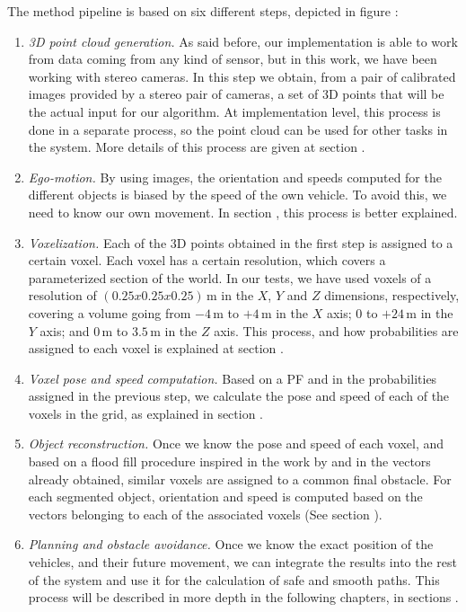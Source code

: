 The method pipeline is based on six different steps, depicted in figure \todo{ \ref{fig:cp05_pipeline_general} }:
\begin{enumerate}
 \item \emph{3D point cloud generation.} As said before, our implementation is able to work from data coming from any kind of sensor, but in this work, we have been working with stereo cameras. In this step we obtain, from a pair of calibrated images provided by a stereo pair of cameras, a set of 3D points that will be the actual input for our algorithm. At implementation level, this process is done in a separate process, so the point cloud can be used for other tasks in the system. More details of this process are given at section \todo{ \ref{chapter05_01_01} }.
 \item \emph{Ego-motion.} By using images, the orientation and speeds computed for the different objects is biased by the speed of the own vehicle. To avoid this, we need to know our own movement. In section \todo{ \ref{chapter05_01_02} }, this process is better explained.
 \item \emph{Voxelization.} Each of the 3D points obtained in the first step is assigned to a certain voxel. Each voxel has a certain resolution, which covers a parameterized section of the world. In our tests, we have used voxels of a resolution of $(0.25x0.25x0.25)$\,m in the $X$, $Y$ and $Z$ dimensions, respectively, covering a volume going from $-4$\,m to $+4$\,m in the $X$ axis; $0$ to $+24$\,m in the $Y$ axis; and $0$\,m to $3.5$\,m in the $Z$ axis. This process, and how probabilities are assigned to each voxel is explained at section \todo{\ref{chapter05_01_03}}.
 \item \emph{Voxel pose and speed computation.} Based on a \acf{PF} and in the probabilities assigned in the previous step, we calculate the pose and speed of each of the voxels in the grid, as explained in section \todo{\ref{chapter05_01_04}}.
 \item \emph{Object reconstruction.} Once we know the pose and speed of each voxel, and based on a flood fill procedure inspired in the work by \cite{broggi2013} and in the vectors already obtained, similar voxels are assigned to a common final obstacle. For each segmented object, orientation and speed is computed based on the vectors belonging to each of the associated voxels (See section \todo{\ref{chapter05_01_05}}).
 \item \emph{Planning and obstacle avoidance.} Once we know the exact position of the vehicles, and their future movement, we can integrate the results into the rest of the system and use it for the calculation of safe and smooth paths. This process will be described in more depth in the following chapters, in sections \todo{ \ref{chapter05_01_06} }.
\end{enumerate}


